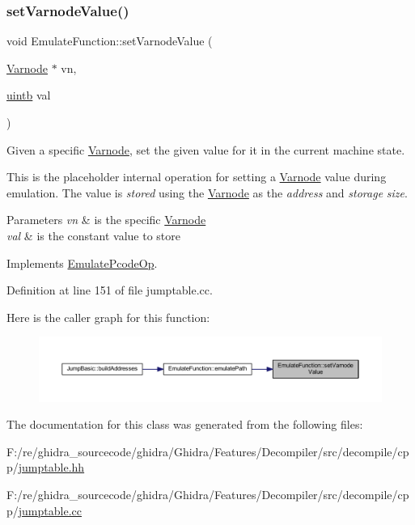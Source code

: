 \subsubsection{\texorpdfstring{setVarnodeValue()}{setVarnodeValue()}}
{\footnotesize\ttfamily void Emulate\+Function\+::set\+Varnode\+Value (\begin{DoxyParamCaption}\item[{\mbox{\hyperlink{class_varnode}{Varnode}} $\ast$}]{vn,  }\item[{\mbox{\hyperlink{types_8h_a2db313c5d32a12b01d26ac9b3bca178f}{uintb}}}]{val }\end{DoxyParamCaption})\hspace{0.3cm}{\ttfamily [virtual]}}



Given a specific \mbox{\hyperlink{class_varnode}{Varnode}}, set the given value for it in the current machine state. 

This is the placeholder internal operation for setting a \mbox{\hyperlink{class_varnode}{Varnode}} value during emulation. The value is {\itshape stored} using the \mbox{\hyperlink{class_varnode}{Varnode}} as the {\itshape address} and {\itshape storage} {\itshape size}. 
\begin{DoxyParams}{Parameters}
{\em vn} & is the specific \mbox{\hyperlink{class_varnode}{Varnode}} \\
\hline
{\em val} & is the constant value to store \\
\hline
\end{DoxyParams}


Implements \mbox{\hyperlink{class_emulate_pcode_op_a44bfa9a3b6d87135a6bfc6680d01ea27}{Emulate\+Pcode\+Op}}.



Definition at line 151 of file jumptable.\+cc.

Here is the caller graph for this function\+:
\nopagebreak
\begin{figure}[H]
\begin{center}
\leavevmode
\includegraphics[width=350pt]{class_emulate_function_a9b130aee822f3e00552259a3ecaf14ff_icgraph}
\end{center}
\end{figure}


The documentation for this class was generated from the following files\+:\begin{DoxyCompactItemize}
\item 
F\+:/re/ghidra\+\_\+sourcecode/ghidra/\+Ghidra/\+Features/\+Decompiler/src/decompile/cpp/\mbox{\hyperlink{jumptable_8hh}{jumptable.\+hh}}\item 
F\+:/re/ghidra\+\_\+sourcecode/ghidra/\+Ghidra/\+Features/\+Decompiler/src/decompile/cpp/\mbox{\hyperlink{jumptable_8cc}{jumptable.\+cc}}\end{DoxyCompactItemize}
